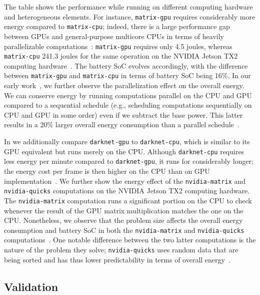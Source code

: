 The table shows the performance while running on different computing hardware and heterogeneous elements. For instance, {\small\tt matrix-gpu} requires considerably more energy compared to {\small\tt matrix-cpu}; indeed, there is a large performance gap between GPUs and general-purpose multicore CPUs in terms of heavily parallelizable computations~\citep{kirk2016programming}: {\small\tt matrix-gpu} requires only 4.5 joules, whereas {\small\tt matrix-cpu} 241.3 joules for the same operation on the NVIDIA Jetson TX2 computing hardware~\citep{seewald2019coarse}. The battery SoC evolves accordingly, with the difference between {\small\tt matrix-gpu} and {\small\tt matrix-cpu} in terms of battery SoC being 16\%. In our early work~\citep{seewald2019coarse,seewald2019component}, we further observe the parallelization effect on the overall energy. We can conserve energy by running computations parallel on the CPU and GPU compared to a sequential schedule (e.g., scheduling computations sequentially on CPU and GPU in some order) even if we subtract the base power. This latter results in a 20\% larger overall energy consumption than a parallel schedule~\citep{seewald2019coarse}.

In  we additionally compare {\small\tt darknet-gpu} to {\small\tt darknet-cpu}, which is similar to its GPU equivalent but runs merely on the CPU. Although {\small\tt darknet-cpu} requires less energy per minute compared to {\small\tt darknet-gpu}, it runs for considerably longer; the energy cost per frame is then higher on the CPU than on GPU implementation~\citep{seewald2019coarse}. We further show the energy effect of the {\small\tt nvidia-matrix} and {\small\tt nvidia-quicks} computations on the NVIDIA Jetson TX2 computing hardware. The {\small\tt nvidia-matrix} computation runs a significant portion on the CPU to check whenever the result of the GPU matrix multiplication matches the one on the CPU. Nonetheless, we observe that the problem size affects the overall energy consumption and battery SoC in both the {\small\tt nvidia-matrix} and {\small\tt nvidia-quicks} computations~\citep{seewald2019coarse}. One notable difference between the two latter computations is the nature of the problem they solve; {\small\tt nvidia-quicks} uses random data that are being sorted and has thus lower predictability in terms of overall energy~\citep{seewald2019coarse}.

\subsection{Validation}
\label{sec:res-validation-nikov}

